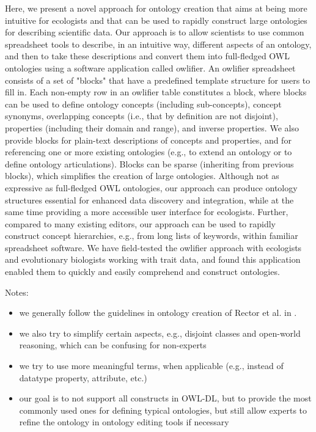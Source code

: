 \documentclass[preprint,number]{elsarticle}
\begin{document}
Here, we present a novel approach for ontology creation that aims at
being more intuitive for ecologists and that can be used to rapidly
construct large ontologies for describing scientific data. Our
approach is to allow scientists to use common spreadsheet tools to
describe, in an intuitive way, different aspects of an ontology, and
then to take these descriptions and convert them into full-fledged OWL
ontologies using a software application called owlifier. An owlifier
spreadsheet consists of a set of "blocks" that have a predefined
template structure for users to fill in. Each non-empty row in an
owlifier table constitutes a block, where blocks can be used to define
ontology concepts (including sub-concepts), concept synonyms,
overlapping concepts (i.e., that by definition are not disjoint),
properties (including their domain and range), and inverse
properties. We also provide blocks for plain-text descriptions of
concepts and properties, and for referencing one or more existing
ontologies (e.g., to extend an ontology or to define ontology
articulations). Blocks can be sparse (inheriting from previous
blocks), which simplifies the creation of large ontologies. Although
not as expressive as full-fledged OWL ontologies, our approach can
produce ontology structures essential for enhanced data discovery and
integration, while at the same time providing a more accessible user
interface for ecologists. Further, compared to many existing editors,
our approach can be used to rapidly construct concept hierarchies,
e.g., from long lists of keywords, within familiar spreadsheet
software. We have field-tested the owlifier approach with ecologists
and evolutionary biologists working with trait data, and found this
application enabled them to quickly and easily comprehend and
construct ontologies.


Notes: 
\begin{itemize}
\item we generally follow the guidelines in ontology creation of
  Rector et al. in \cite{rector04:_owl_pizzas}.
\item we also try to simplify certain aspects, e.g., disjoint classes
  and open-world reasoning, which can be confusing for non-experts
\item we try to use more meaningful terms, when applicable (e.g., instead of datatype property, attribute, etc.)
\item our goal is to not support all constructs in OWL-DL, but to
  provide the most commonly used ones for defining typical ontologies,
  but still allow experts to refine the ontology in ontology editing
  tools if necessary
\end{itemize}
\end{document}
